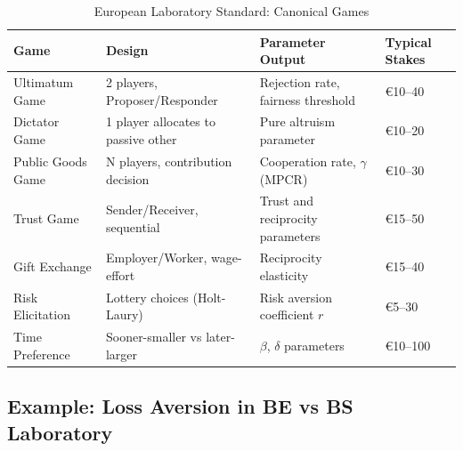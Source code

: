\documentclass[11pt, a4paper]{article}
\begin{document}
\begin{table}[htbp]
\centering
\caption{European Laboratory Standard: Canonical Games}
\label{tab:evd-canonical-games}
\renewcommand{\arraystretch}{1.3}
\begin{tabular}{@{}p{3cm}p{3cm}p{4cm}p{3cm}@{}}
\toprule
\textbf{Game} & \textbf{Design} & \textbf{Parameter Output} & \textbf{Typical Stakes} \\
\midrule
Ultimatum Game & 2 players, Proposer/Responder & Rejection rate, fairness threshold & €10--40 \\
Dictator Game & 1 player allocates to passive other & Pure altruism parameter & €10--20 \\
Public Goods Game & N players, contribution decision & Cooperation rate, $\gamma$ (MPCR) & €10--30 \\
Trust Game & Sender/Receiver, sequential & Trust and reciprocity parameters & €15--50 \\
Gift Exchange & Employer/Worker, wage-effort & Reciprocity elasticity & €15--40 \\
Risk Elicitation & Lottery choices (Holt-Laury) & Risk aversion coefficient $r$ & €5--30 \\
Time Preference & Sooner-smaller vs later-larger & $\beta$, $\delta$ parameters & €10--100 \\
\bottomrule
\end{tabular}
\end{table}

\subsection{Example: Loss Aversion in BE vs BS Laboratory}
\end{document}
